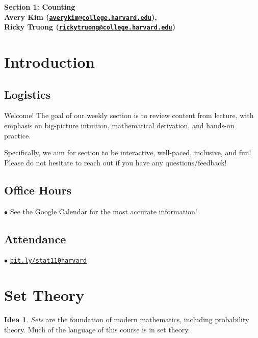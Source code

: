 \documentclass[12pt,oneside]{article}
\theoremstyle{definition}
\newtheorem*{idea}{Idea}
\theoremstyle{remark}
\begin{document}
\pagestyle{fancy}
\begin{center}
\bf \Large
Section 1: Counting \\[0.5em]
\normalsize
Avery Kim (\href{mailto:averykim@college.harvard.edu}{\texttt{averykim@college.harvard.edu}}), \\[0.2em]
Ricky Truong (\href{mailto:rickytruong@college.harvard.edu}{\texttt{rickytruong@college.harvard.edu}})
\end{center}

\section{Introduction}

\subsection{Logistics}

Welcome! The goal of our weekly section is to review content from lecture, with emphasis on big-picture intuition, mathematical derivation, and hands-on practice.

Specifically, we aim for section to be interactive, well-paced, inclusive, and fun! Please do not hesitate to reach out if you have any questions/feedback!

\subsection{Office Hours}

$\bullet$ See the Google Calendar for the most accurate information!

\subsection{Attendance}

$\bullet$ \href{https://bit.ly/stat110harvard}{\texttt{bit.ly/stat110harvard}}

\section{Set Theory}

\begin{idea}
\textit{Sets} are the foundation of modern mathematics, including probability theory. Much of the language of this course is in set theory. 
\end{idea}
\end{document}
